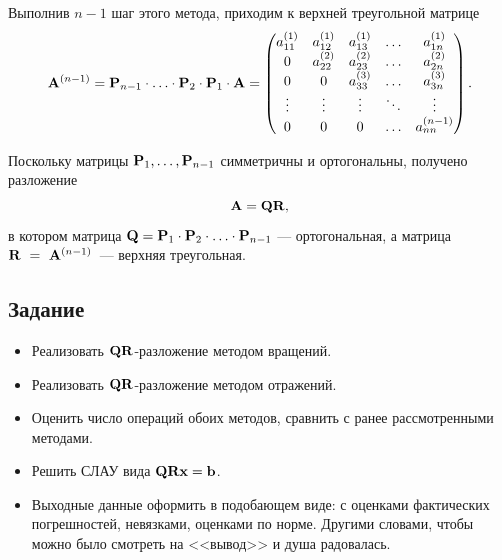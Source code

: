 \documentclass[12pt]{article}
\begin{document}
    Выполнив $n-1$ шаг этого метода, приходим к верхней треугольной матрице
    \begin{equation}
    	\begin{gathered}
    	\bold{A}^{\left(n-1\right)}=\bold{P}_{n-1}\cdot\ldots\cdot\bold{P}_2\cdot\bold{P}_1\cdot \bold{A}=
    	\begin{pmatrix}
    		a_{11}^{\left(1\right)} & a_{12}^{\left(1\right)} & a_{13}^{\left(1\right)} & \ldots & a_{1n}^{\left(1\right)} \\
    		0 & a_{22}^{\left(2\right)} & a_{23}^{\left(2\right)} & \ldots & a_{2n}^{\left(2\right)} \\
    		0 & 0 & a_{33}^{\left(3\right)} & \ldots & a_{3n}^{\left(3\right)} \\
   			\vdots & \vdots & \vdots & \ddots & \vdots \\
  			0 & 0 & 0 & \ldots & a_{nn}^{\left(n-1\right)}
    	\end{pmatrix}.
    	\end{gathered}
    \end{equation}
    
    Поскольку матрицы $\bold{P}_1,\ldots,\bold{P}_{n-1}$ симметричны и ортогональны, получено разложение
    \begin{equation}
    	\bold{A}=\bold{QR},
    \end{equation}
    в котором матрица $\bold{Q}=\bold{P}_1\cdot\bold{P}_2\cdot\ldots\cdot\bold{P}_{n-1}$ --- ортогональная, а матрица\linebreak $\bold{R}~=~\bold{A}^{\left(n-1\right)}$~--- верхняя треугольная.
	
    \subsection*{Задание}

    \begin{itemize}
    	\item Реализовать $\bold{QR}$-разложение методом вращений.
    	\item Реализовать $\bold{QR}$-разложение методом отражений.
    	\item Оценить число операций обоих методов, сравнить с ранее рассмотренными методами.
    	\item Решить СЛАУ вида $\bold{QRx}=\bold{b}$.
    	\item Выходные данные оформить в подобающем виде: с оценками фактических погрешностей, невязками, оценками по норме. Другими словами, чтобы можно было смотреть на <<вывод>> и душа радовалась.
    \end{itemize}
\end{document}

